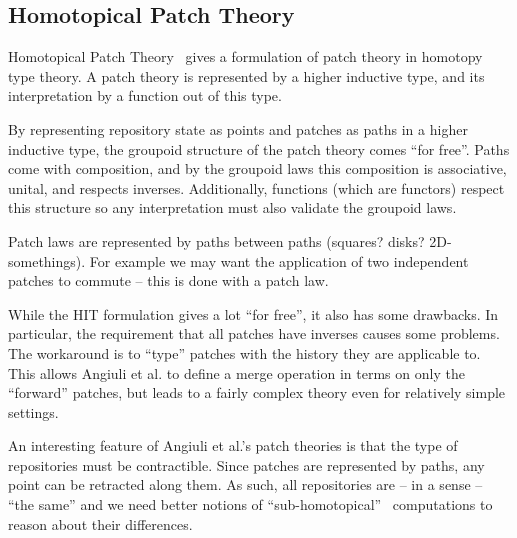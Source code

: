 \subsection{Homotopical Patch Theory}\label{subsec:hpt}
Homotopical Patch Theory~\cite{Angiuli2016} gives a formulation of patch theory
in homotopy type theory. A patch theory is represented by a higher
inductive type, and its interpretation by a function out of this type.

By representing repository state as points and patches as paths in a higher
inductive type, the groupoid structure of the patch theory comes ``for free''.
Paths come with composition, and by the groupoid laws this composition is
associative, unital, and respects inverses. Additionally, functions (which are functors)
respect this structure so any interpretation must also validate the groupoid
laws.

Patch laws are represented by paths between paths (squares? disks?
2D-somethings). For example we may want the application of two independent
patches to commute -- this is done with a patch law.

While the HIT formulation gives a lot ``for free'', it also has some drawbacks.
In particular, the requirement that all patches have inverses causes some
problems. The workaround is to ``type'' patches with the history they are
applicable to. This allows Angiuli et al. to define a merge operation in terms
on only the ``forward'' patches, but leads to a fairly complex theory even for
relatively simple settings.

An interesting feature of Angiuli et al.'s patch theories is that the type of
repositories must be contractible. Since patches are represented by paths, any
point can be retracted along them. As such, all repositories are -- in a sense
-- ``the same'' and we need better notions of
``sub-homotopical''~\cite{Angiuli2016} computations to reason about their differences.